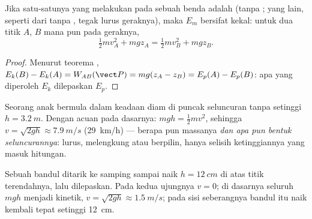 \begin{theorem}\label{thm:g11:mechanical-energy:conservation}
Jika satu-satunya  yang melakukan  pada sebuah benda adalah
 (tanpa ;  yang lain, seperti  dari 
tanpa , tegak lurus geraknya), maka $E_m$ bersifat kekal: untuk
dua titik $A$, $B$ mana pun pada geraknya,
\[
\tfrac12 m v_A^2 + m g z_A = \tfrac12 m v_B^2 + m g z_B .
\]
\end{theorem}

\begin{proof}
Menurut teorema , $E_k(B) - E_k(A) = W_{AB}(\vect P) =
mg(z_A - z_B) = E_p(A) - E_p(B)$: apa yang diperoleh $E_k$ dilepaskan
$E_p$.
\end{proof}

\begin{example}\label{ex:g11:mechanical-energy:slide}
Seorang anak bermula dalam keadaan diam di puncak seluncuran tanpa
 setinggi $h = \qty{3.2}{m}$. Dengan acuan pada dasarnya:
$mgh = \tfrac12 mv^2$, sehingga $v = \sqrt{2gh} \approx \qty{7.9}{m/s}$
(\qty{29}{km/h}) --- berapa pun massanya \emph{dan apa pun bentuk
seluncurannya}: lurus, melengkung atau berpilin, hanya selisih
ketinggiannya yang masuk hitungan.
\end{example}

\begin{example}[Bandul]\label{ex:g11:mechanical-energy:pendulum}
Sebuah bandul ditarik ke samping sampai naik $h = \qty{12}{cm}$ di atas
titik terendahnya, lalu dilepaskan. Pada kedua ujungnya $v = 0$; di
dasarnya seluruh $mgh$ menjadi kinetik,
$v = \sqrt{2gh} \approx \qty{1.5}{m/s}$; pada sisi seberangnya bandul
itu naik kembali tepat setinggi \qty{12}{cm}.
\end{example}

